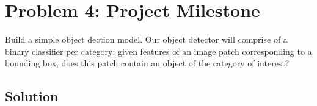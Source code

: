 \section*{Problem 4: Project Milestone}

Build a simple object dection model. Our object detector will comprise of a
binary classifier per category: given features of an image patch corresponding
to a bounding box, does this patch contain an object of the category of
interest?

\subsection*{Solution}
